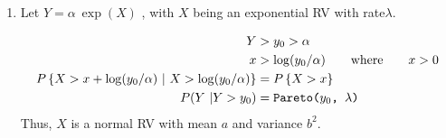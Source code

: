 \begin{enumerate}
	
	\item Let $ Y = \alpha\ \exp(X) $ , with $ X $ being an exponential RV with rate$ \lambda $.
			
		\begin{align}
			Y &> y_0 > \alpha \nonumber \\
			x &> \log(y_0/\alpha) \qquad \text{where} \qquad x > 0 \\
			P\left\{X > x +  \log(y_0/\alpha)\ |\ X > \log(y_0/\alpha)\right\} &= P \left\{X > x\right\} \\
			P(Y\ |Y > y_0) &= \texttt{Pareto($ y_0 $, $ \lambda $)}
		\end{align}
		Thus, $ X $ is a normal RV with mean $ a $ and variance $ b^2 $.
		
		
	
	
\end{enumerate}